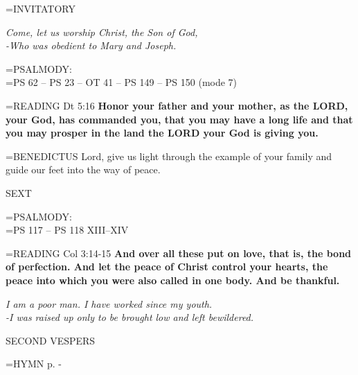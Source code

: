 \hangindent=\parindent \small{INVITATORY}
\begin{center}
\textit{Come, let us worship Christ, the Son of God,\\}
\textit{-Who was obedient to Mary and Joseph.\\}
\end{center}

\hangindent=\parindent \small{PSALMODY:}\\
\hangindent=\parindent  PS 62 -- PS 23 -- OT 41 -- PS 149 -- PS 150 (mode 7)\vspace{0.5em}

\hangindent=\parindent \small{READING}    Dt 5:16 \textbf{   Honor your father and your mother, as the LORD, your God, has commanded you, that you may have a long life and that you may prosper in the land the LORD your God is giving you. \\}

\hangindent=\parindent \small{BENEDICTUS 	Lord, give us light through the example of your family and guide our feet into the way of peace.\\}

\begin{flushleft}\normalsize SEXT\\\end{flushleft}

\hangindent=\parindent \small{PSALMODY:}\\
\hangindent=\parindent  PS 117 -- PS 118 XIII--XIV\vspace{0.5em}

\hangindent=\parindent \small{READING}    Col 3:14-15 \textbf{   And over all these put on love, that is, the bond of perfection. And let the peace of Christ control your hearts, the peace into which you were also called in one body. And be thankful.}

\begin{center}
\textit{I am a poor man. I have worked since my youth.\\
-I was raised up only to be brought low and left bewildered.}
\end{center}

\begin{flushleft}\normalsize SECOND VESPERS\\\end{flushleft}

\hangindent=\parindent \small{\uppercase{HYMN} p.  \pageref{christmas:firstHymn} - \pageref{christmas:lastHymn}\\}


